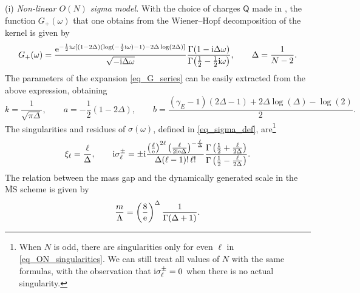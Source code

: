 \documentclass[a4paper,11pt]{article}
\theoremstyle{definition}
\newcommand{\re}{{\rm e}}
\newcommand{\ri}{{\rm i}}
\begin{document}
(i) \textit{Non-linear $O(N)$ sigma model.} With the choice of charges $\mathsf{Q}$ made in \cite{hmn,hn}, the function $G_+(\omega)$ that one obtains from the Wiener--Hopf decomposition of the kernel is given by
\begin{equation}
G_+(\omega) = \frac{\re^{-{1 \over 2} \ri \omega [(1-2\Delta)(\log(-\frac{1}{2}\ri \omega)-1)-2\Delta\log(2\Delta)]}}{\sqrt{-\ri \Delta \omega}}\frac{\Gamma(1-\ri \Delta \omega)}{\Gamma\big(\tfrac{1}{2}-\tfrac{1}{2}\ri\omega\big)}, \qquad \Delta = \frac{1}{N-2}.
\end{equation}
The parameters of the expansion \eqref{eq_G_series} can be easily extracted from the above expression, obtaining
\begin{equation}
k = \frac{1}{\sqrt{\pi\Delta}}, \qquad a = -\frac{1}{2} (1-2 \Delta), \qquad b=\frac{(\gamma_E -1) (2 \Delta -1)+2 \Delta  \log (\Delta )-\log (2)}{2}.
\end{equation}
The singularities and residues of $\sigma(\omega)$, defined in \eqref{eq_sigma_def}, are\footnote{When $N$ is odd, there are singularities only for even $\ell$ in \eqref{eq_ON_singularities}. We can still treat all values of $N$ with the same formulas, with the observation that $\ri\sigma_\ell^\pm = 0$ when there is no actual singularity.}
\begin{equation}
\xi_\ell = \frac{\ell}{\Delta}, \qquad \ri\sigma_\ell^\pm = \pm \ri \frac{ \left( \frac{\ell}{\re}\right)^{2 \ell} \left(\frac{\ell}{2\ri\re\Delta }\right)^{-\frac{\ell}{\Delta }} }{\Delta  (\ell-1)!\, \ell! } \frac{\Gamma \left(\frac{1}{2} + \frac{\ell}{2 \Delta }\right)}{\Gamma \left(\frac{1}{2} - \frac{\ell}{2 \Delta }\right)}.
\label{eq_ON_singularities}
\end{equation}
The relation between the mass gap and the dynamically generated scale in the $\overline{\text{MS}}$ scheme is given by \cite{hmn,hn}
\begin{equation}
\frac{m}{\Lambda} = \left(\frac{8}{\re}\right)^{\Delta } \frac{1}{\Gamma (\Delta +1)}.
\end{equation}
\end{document}
